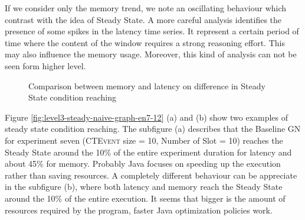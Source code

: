 If we consider only the memory trend, we note an oscillating behaviour which contrast with the idea of Steady State. A more careful analysis identifies the presence of some spikes in the latency time series. It represent a certain period of time where the content of the window requires a strong reasoning effort. This may also influence the memory usage. Moreover, this kind of analysis can not be seen form higher level. 

\begin{figure}[tbh]
  \centering
  \caption{Comparison between memory and latency on difference in Steady State condition reaching} 
  \label{fig:level3-not-steady-naive-graph-en11}
\end{figure}

Figure \ref{fig:level3-steady-naive-graph-en7-12} (a) and (b) show two examples of steady state condition reaching. The subfigure (a) describes that the Baseline GN for experiment seven (\textsc{CTEvent} size = 10, Number of Slot = 10) reaches the Steady State around the 10\% of the entire experiment duration for latency and about 45\% for memory. 
Probably Java focuses on speeding up the execution rather than saving resources. A completely different behaviour can be appreciate in the subfigure (b), where both latency and memory reach the Steady State around the 10\% of the entire execution. It seems that bigger is the amount of resources required by the program, faster Java optimization policies work.


